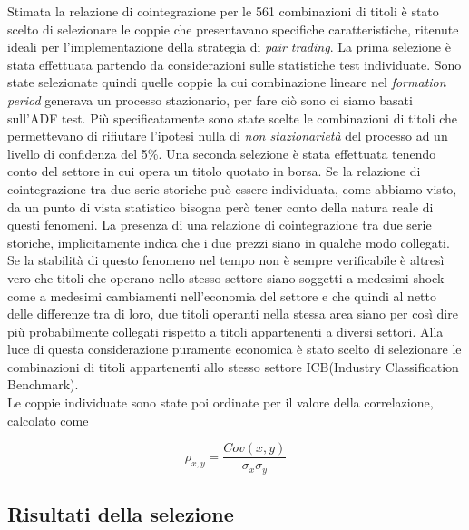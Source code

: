 \documentclass[]{article}
\begin{document}
Stimata la relazione di cointegrazione per le 561 combinazioni di titoli è stato scelto di selezionare le coppie che presentavano specifiche caratteristiche, ritenute ideali per l'implementazione della strategia di \textit{pair trading}.
La prima selezione è stata effettuata partendo da considerazioni sulle statistiche test individuate.
Sono state selezionate quindi quelle coppie la cui combinazione lineare nel \textit{formation period} generava un processo stazionario, per fare ciò sono ci siamo basati sull'ADF test.
Più specificatamente sono state scelte le combinazioni di titoli che permettevano di rifiutare l'ipotesi nulla di \textit{non stazionarietà} del processo ad un livello di confidenza del  5\%.
Una seconda selezione è stata effettuata tenendo conto del settore in cui opera un titolo quotato in borsa.
Se la relazione di cointegrazione tra due serie storiche può essere individuata, come abbiamo visto, da un punto di vista statistico bisogna però tener conto della natura reale di questi fenomeni.
La presenza di una relazione di cointegrazione tra due serie storiche, implicitamente indica che i due prezzi siano in qualche modo collegati.
Se la stabilità di questo fenomeno nel tempo non è sempre verificabile è altresì vero che titoli che operano nello stesso settore siano soggetti a medesimi shock come a medesimi cambiamenti nell'economia del settore e che quindi al netto delle differenze tra di loro, due titoli operanti nella stessa area siano per così dire più probabilmente collegati rispetto a titoli appartenenti a diversi settori.
Alla luce di questa considerazione puramente economica è stato scelto di selezionare le combinazioni di titoli appartenenti allo stesso settore ICB(Industry Classification Benchmark).
\\
Le coppie individuate sono state poi ordinate per il valore della correlazione, calcolato come

\begin{equation}
	\rho_{x,y} = \frac{Cov(x,y)}{\sigma_x \sigma_y}
\end{equation}





\break 
\subsection{Risultati della selezione}
\end{document}
